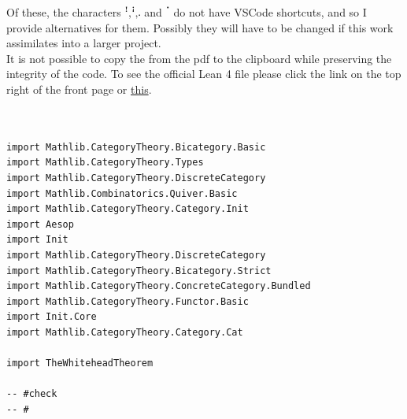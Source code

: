 \documentclass{book}
\theoremstyle{definition}
\newcounter{lcounter}
\begin{document}
Of these, the characters $\texttt{ꜝ,ꜞ,𛲔}$ and $\texttt{ॱ}$ do not have VSCode shortcuts, and so I provide alternatives for them. Possibly they will have to be changed if this work assimilates into a larger project.\\

It is not possible to copy the from the pdf to the clipboard while preserving the integrity of the code. To see the official Lean 4 file please click the link on the top right of the front page or \href{https://github.com/linlib/CategoryTheory/tree/main}{this}.



\begin{center}
\begin{tcolorbox}[width=5in,colback={white},title={\begin{center}\texttt{Lean \thelcounter} \addtocounter{lcounter}{1}  \end{center}},colbacktitle=Blue,coltitle=black]
\begin{verbatim}


import Mathlib.CategoryTheory.Bicategory.Basic
import Mathlib.CategoryTheory.Types 
import Mathlib.CategoryTheory.DiscreteCategory
import Mathlib.Combinatorics.Quiver.Basic
import Mathlib.CategoryTheory.Category.Init
import Aesop
import Init
import Mathlib.CategoryTheory.DiscreteCategory
import Mathlib.CategoryTheory.Bicategory.Strict
import Mathlib.CategoryTheory.ConcreteCategory.Bundled
import Mathlib.CategoryTheory.Functor.Basic
import Init.Core
import Mathlib.CategoryTheory.Category.Cat

import TheWhiteheadTheorem

-- #check 
-- #

\end{verbatim}
\end{tcolorbox}
\end{center}


\newpage
\begin{center}

\pagecolor{white}
\color{black}




\end{center}

\thispagestyle{empty}
\end{document}
